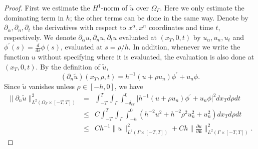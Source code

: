 \documentclass[11pt,letterpaper]{amsart}
\numberwithin{equation}{section}
\theoremstyle{definition}
\theoremstyle{plain}
\theoremstyle{definition}
\theoremstyle{plain}
\theoremstyle{definition}
\theoremstyle{plain}
\begin{document}
\begin{proof}
First we estimate the $H^1$-norm of $\widetilde{u}$ over $\Omega_{\Gamma}$. Here we only estimate the dominating term in $h$; the other terms can be done in the same way. Denote by $\partial_{\alpha},\partial_{n},\partial_t$ the derivatives with respect to $x^{\alpha},x^n$ coordinates and time $t$, respectively. We denote $\partial_{\alpha} u, \partial_{n} u,\partial_t u$ evaluated at $(x_T,0,t)$ by $u_{\alpha},u_{n},u_t$ and $ \phi^{\prime}(s)=\frac{d}{ds}\phi(s)$, evaluated at $s=\rho/h$. In addition, whenever we write the function $u$ without specifying where it is evaluated,  the evaluation is also done at $(x_T,0,t)$. By the definition of $\widetilde{u}$,
\begin{equation}\label{un}
(\partial_n \widetilde{u})(x_T,\rho,t)=h^{-1} (u+\rho u_n) \phi^{\prime}  + u_n\phi.
\end{equation}
Since $\widetilde{u}$ vanishes unless $\rho\in [-h,0]$, we have
\begin{eqnarray*}
\|\partial_n \widetilde{u}\|^2_{L^2(\Omega_{\Gamma}\times [-T,T])} &=& \int_{-T}^{T}  \int_{\Gamma}\int_{-\delta_{ex}}^0   \big| h^{-1}  (u+\rho u_n) \phi^{\prime} + u_n\phi \big|^2 dx_T d\rho dt\\
&\leqslant& C\int_{-T}^{T}  \int_{\Gamma}\int_{-h}^0 (h^{-2}u^2+h^{-2}\rho^2 u_n^2+u_n^2) dx_Td\rho dt \\
&\leqslant& Ch^{-1}\|u\|_{L^2(\Gamma\times [-T,T])}^2+Ch\big\|\frac{\partial u}{\partial \mathbf{n}} \big\|_{L^2(\Gamma\times [-T,T])}^2.
\end{eqnarray*}


\end{proof}
\end{document}

